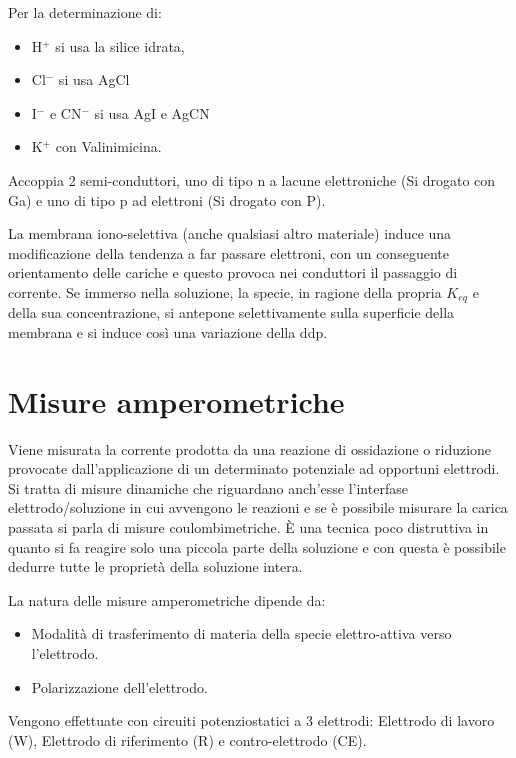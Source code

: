 
Per la determinazione di:
\begin{itemize}
\item H$^+$ si usa la silice idrata,
\item Cl$^-$ si usa AgCl
\item I$^-$ e CN$^-$ si usa AgI e AgCN
\item K$^+$ con Valinimicina.
\end{itemize}

Accoppia 2 semi-conduttori, uno di tipo n a lacune elettroniche (Si drogato con Ga) e uno di tipo p ad elettroni (Si drogato con P).


La membrana iono-selettiva (anche qualsiasi altro materiale) induce una modificazione della tendenza a far passare elettroni, con un conseguente orientamento delle cariche e questo provoca nei conduttori il passaggio di corrente.
Se immerso nella soluzione, la specie, in ragione della propria $K_{eq}$ e della sua concentrazione, si antepone selettivamente sulla superficie della membrana e si induce così una variazione della ddp.

\section{Misure amperometriche}
Viene misurata la corrente prodotta da una reazione di ossidazione o riduzione provocate dall'applicazione di un determinato potenziale ad opportuni elettrodi.
Si tratta di misure dinamiche che riguardano anch'esse l'interfase elettrodo/soluzione in cui avvengono le reazioni e se è possibile misurare la carica passata si parla di misure coulombimetriche.
È una tecnica poco distruttiva in quanto si fa reagire solo una piccola parte della soluzione e con questa è possibile dedurre tutte le proprietà della soluzione intera.

La natura delle misure amperometriche dipende da:
\begin{itemize}
\item Modalità di trasferimento di materia della specie elettro-attiva verso l'elettrodo.
\item Polarizzazione dell'elettrodo.
\end{itemize}

Vengono effettuate con circuiti potenziostatici a 3 elettrodi:
Elettrodo di lavoro (W), Elettrodo di riferimento (R) e contro-elettrodo (CE).


